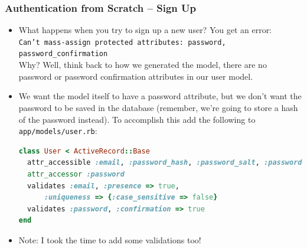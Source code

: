 \documentclass[t,handout]{beamer}
\begin{document}
\begin{frame}[fragile]\frametitle{Authentication from Scratch -- Sign Up}
\vspace*{-0.1in}
{\small
 \begin{itemize}
  \item What happens when you try to sign up a new user?  \pause You get an error: ~\\
   {\footnotesize\tt Can't mass-assign protected attributes: password, password\_confirmation} ~\\ \pause
  Why?  \pause Well, think back to how we generated the model, \pause there are no password or password confirmation attributes in our user model.
  \pause
  \item We want the model itself to have a password attribute, but we don't want the password to be saved in the database (remember, we're  going to store a hash of the password instead).  \pause  To accomplish this add the following to {\tt app/models/user.rb}:
  
\begin{lstlisting}[frame=none,language=Ruby,basicstyle=\scriptsize\ttfamily\color{black},]
class User < ActiveRecord::Base
  attr_accessible :email, :password_hash, :password_salt, :password, :password_confirmation
  attr_accessor :password
  validates :email, :presence => true, 
      :uniqueness => {:case_sensitive => false}
  validates :password, :confirmation => true  
end
\end{lstlisting}
   \pause
   \item  Note: I took the time to add some validations too! 
 \end{itemize}} 
\end{frame}
\end{document}

